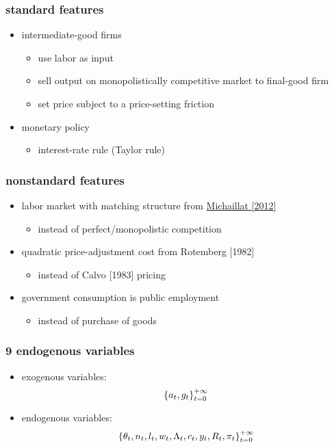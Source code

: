 \documentclass[12pt,xcolor={dvipsnames},hyperref={pdftex,pdfpagemode=UseNone,hidelinks,pdfdisplaydoctitle=true},usepdftitle=false]{beamer}
\begin{document}
\begin{frame}
\frametitle{standard features}
\begin{itemize}
\item intermediate-good firms
\begin{itemize}
\item use labor as input
\item sell output on monopolistically competitive market to final-good firm
\item set price subject to a price-setting friction
\end{itemize} 
\item monetary policy
\begin{itemize}
\item interest-rate rule (Taylor rule)
\end{itemize}
\end{itemize}
\end{frame}

\begin{frame}
\frametitle{nonstandard features}
\begin{itemize}
\item labor market with matching structure from \href{https://www.pascalmichaillat.org/1.html}{Michaillat [2012]}
\begin{itemize}
\item instead of perfect/monopolistic competition
\end{itemize}
\item quadratic price-adjustment cost from Rotemberg [1982] 
\begin{itemize}
\item instead of Calvo [1983] pricing
\end{itemize}
\item government consumption is public employment
\begin{itemize}
\item instead of purchase of goods
\end{itemize}
\end{itemize}
\end{frame}


\begin{frame}
\frametitle{9 endogenous variables}
\begin{itemize}
\item exogenous variables:
\begin{equation*}
\left\lbrace a_{t},g_{t} \right\rbrace_{t=0}^{+\infty}
\end{equation*}
\item endogenous variables:
\begin{equation*}
\left\lbrace \theta_{t},n_{t},l_{t},w_{t},\Lambda_{t},c_{t},y_{t},R_{t},\pi_{t} \right\rbrace_{t=0}^{+\infty}
\end{equation*}
\end{itemize}
\end{frame}
\end{document}

